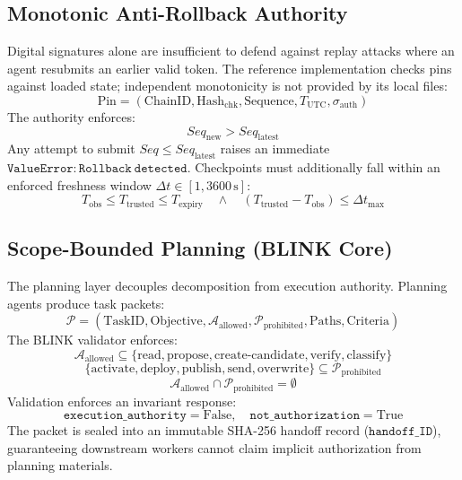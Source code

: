 \documentclass[11pt,a4paper]{article}
\begin{document}
\subsection{Monotonic Anti-Rollback Authority}
Digital signatures alone are insufficient to defend against replay attacks where an agent resubmits an earlier valid token. The reference implementation checks pins against loaded state; independent monotonicity is not provided by its local files:
\begin{equation}
    \text{Pin} = (\text{ChainID}, \text{Hash}_{\text{chk}}, \text{Sequence}, T_{\text{UTC}}, \sigma_{\text{auth}})
\end{equation}
The authority enforces:
\begin{equation}
    Seq_{\text{new}} > Seq_{\text{latest}}
\end{equation}
Any attempt to submit $Seq \le Seq_{\text{latest}}$ raises an immediate $\mathtt{ValueError: Rollback\ detected}$. Checkpoints must additionally fall within an enforced freshness window $\Delta t \in [1, 3600\,\text{s}]$:
\begin{equation}
    T_{\text{obs}} \le T_{\text{trusted}} \le T_{\text{expiry}} \quad \land \quad (T_{\text{trusted}} - T_{\text{obs}}) \le \Delta t_{\text{max}}
\end{equation}

\subsection{Scope-Bounded Planning (BLINK Core)}
The planning layer decouples decomposition from execution authority. Planning agents produce task packets:
\begin{equation}
    \mathcal{P} = (\text{TaskID}, \text{Objective}, \mathcal{A}_{\text{allowed}}, \mathcal{P}_{\text{prohibited}}, \text{Paths}, \text{Criteria})
\end{equation}
The BLINK validator enforces:
\begin{equation}
    \mathcal{A}_{\text{allowed}} \subseteq \{\text{read}, \text{propose}, \text{create-candidate}, \text{verify}, \text{classify}\}
\end{equation}
\begin{equation}
    \{\text{activate}, \text{deploy}, \text{publish}, \text{send}, \text{overwrite}\} \subseteq \mathcal{P}_{\text{prohibited}}
\end{equation}
\begin{equation}
    \mathcal{A}_{\text{allowed}} \cap \mathcal{P}_{\text{prohibited}} = \emptyset
\end{equation}
Validation enforces an invariant response:
\begin{equation}
    \mathtt{execution\_authority} = \text{False}, \quad \mathtt{not\_authorization} = \text{True}
\end{equation}
The packet is sealed into an immutable SHA-256 handoff record ($\mathtt{handoff\_ID}$), guaranteeing downstream workers cannot claim implicit authorization from planning materials.
\end{document}

